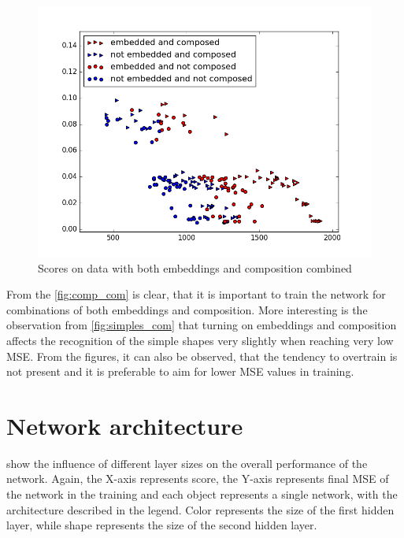 \begin{description}
\begin{description}
\begin{figure}
\centering
\includegraphics[width=.8\linewidth]{ext/figure_x_com.png}
\caption{Scores on data with both embeddings and composition combined}
\label{fig:x_com}
\end{figure}

From the \cref{fig:comp_com}  is clear, that it is important to train the network for combinations of both embeddings and composition. More interesting is the observation from \cref{fig:simples_com} that turning on embeddings and composition affects the recognition of the simple shapes very slightly when reaching very low MSE. From the figures, it can also be observed, that the tendency to overtrain is not present and it is preferable to aim for lower MSE values in training.

\section{Network architecture}
  show the influence of different layer sizes on the overall performance of the network. Again, the X-axis represents score, the Y-axis represents final MSE of the network in the training and each object represents a single network, with the architecture described in the legend. Color represents the size of the first hidden layer, while shape represents the size of the second hidden layer.


\end{description}
\end{description}
